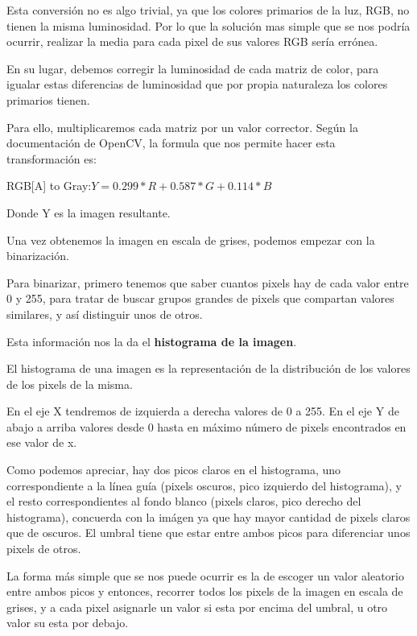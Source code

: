 Esta conversión no es algo trivial, ya que los colores primarios de la luz, RGB, no tienen la misma luminosidad. Por lo que la solución mas simple que se nos podría ocurrir, realizar la media para cada pixel de sus valores RGB sería errónea.

En su lugar, debemos corregir la luminosidad de cada matriz de color, para igualar estas diferencias de luminosidad que por propia naturaleza los colores primarios tienen. 

Para ello, multiplicaremos cada matriz por un valor corrector.
Según la documentación de OpenCV\cite{OpenCVRGBGRAY}, la formula que nos permite hacer esta transformación es:

RGB[A] to Gray:$Y=0.299*R+0.587*G+0.114*B$

Donde Y es la imagen resultante.

Una vez obtenemos la imagen en escala de grises, podemos empezar con la binarización.

Para binarizar, primero tenemos que saber cuantos pixels hay de cada valor entre 0 y 255, para tratar de buscar grupos grandes de pixels que compartan valores similares, y así distinguir unos de otros. 

Esta información nos la da el \textbf{histograma de la imagen}.

El histograma de una imagen es la representación de la distribución de los valores de los pixels de la misma.

En el eje X tendremos de izquierda a derecha valores de 0 a 255. En el eje Y de abajo a arriba valores desde 0 hasta en máximo número de pixels encontrados en ese valor de x.


Como podemos apreciar, hay dos picos claros en el histograma, uno correspondiente a la línea guía (pixels oscuros, pico izquierdo del histograma), y el resto correspondientes al fondo blanco (pixels claros, pico derecho del histograma), concuerda con la imágen ya que hay mayor cantidad de pixels claros que de oscuros. El umbral tiene que estar entre ambos picos para diferenciar unos pixels de otros.

La forma más simple que se nos puede ocurrir es la de escoger un valor aleatorio entre ambos picos y entonces, recorrer todos los pixels de la imagen en escala de grises, y a cada pixel asignarle un valor si esta por encima del umbral, u otro valor su esta por debajo.

